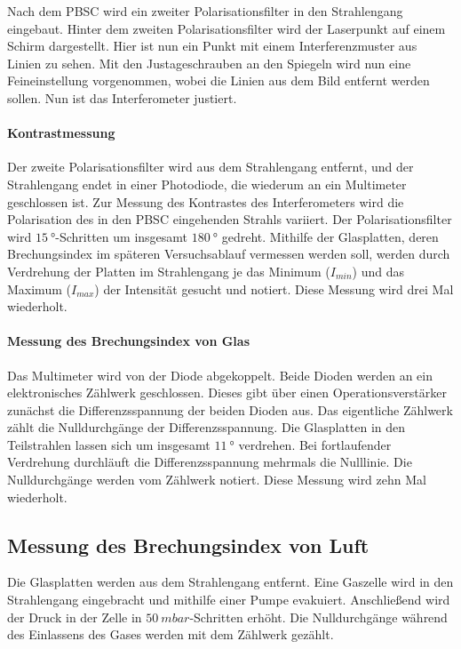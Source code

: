 Nach dem PBSC wird ein zweiter Polarisationsfilter in den Strahlengang eingebaut.
Hinter dem zweiten Polarisationsfilter wird der Laserpunkt auf einem Schirm dargestellt.
Hier ist nun ein Punkt mit einem Interferenzmuster aus Linien zu sehen.
Mit den Justageschrauben an den Spiegeln wird nun eine Feineinstellung vorgenommen, wobei die Linien aus dem Bild entfernt werden sollen.
Nun ist das Interferometer justiert.

\paragraph{Kontrastmessung}
Der zweite Polarisationsfilter wird aus dem Strahlengang entfernt, und der Strahlengang endet in einer Photodiode, die wiederum an ein Multimeter geschlossen ist.
Zur Messung des Kontrastes des Interferometers wird die Polarisation des in den PBSC eingehenden Strahls variiert.
Der Polarisationsfilter wird $\SI{15}{°}$-Schritten um insgesamt $\SI{180}{°}$ gedreht.
Mithilfe der Glasplatten, deren Brechungsindex im späteren Versuchsablauf vermessen werden soll, werden durch Verdrehung der Platten im Strahlengang je das Minimum ($I_{min}$) und das Maximum ($I_{max}$) der Intensität gesucht und notiert.
Diese Messung wird drei Mal wiederholt.

\paragraph{Messung des Brechungsindex von Glas}
Das Multimeter wird von der Diode abgekoppelt.
Beide Dioden werden an ein elektronisches Zählwerk geschlossen.
Dieses gibt über einen Operationsverstärker zunächst die Differenzsspannung der beiden Dioden aus.
Das eigentliche Zählwerk zählt die Nulldurchgänge der Differenzsspannung.
Die Glasplatten in den Teilstrahlen lassen sich um insgesamt $\SI{11}{°}$ verdrehen.
Bei fortlaufender Verdrehung durchläuft die Differenzsspannung mehrmals die Nulllinie.
Die Nulldurchgänge werden vom Zählwerk notiert.
Diese Messung wird zehn Mal wiederholt.

\subsection{Messung des Brechungsindex von Luft}
Die Glasplatten werden aus dem Strahlengang entfernt.
Eine Gaszelle wird in den Strahlengang eingebracht und mithilfe einer Pumpe evakuiert.
Anschließend wird der Druck in der Zelle in $\SI{50}{mbar}$-Schritten erhöht.
Die Nulldurchgänge während des Einlassens des Gases werden mit dem Zählwerk gezählt.
